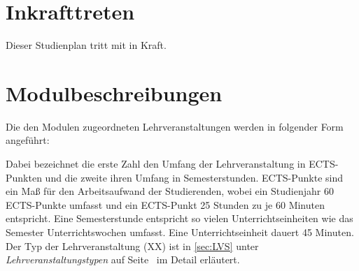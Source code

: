 %

\section{Inkrafttreten}\label{sec:IK}

Dieser Studienplan tritt mit  in Kraft.

%

\appendix
\section{Modulbeschreibungen}\label{app:AMB}

Die den Modulen zugeordneten Lehrveranstaltungen werden in folgender
Form angeführt:

\noindent
Dabei bezeichnet die erste Zahl den Umfang der Lehrveranstaltung in
ECTS-Punkten und die zweite ihren Umfang in
Semesterstunden. ECTS-Punkte sind ein Maß für den Arbeitsaufwand der
Studierenden, wobei ein Studienjahr 60 ECTS-Punkte umfasst und ein
ECTS-Punkt 25 Stunden zu je 60 Minuten entspricht. Eine Semesterstunde
entspricht so vielen Unterrichtseinheiten wie das Semester
Unterrichtswochen umfasst. Eine Unterrichtseinheit dauert 45 Minuten.
Der Typ der Lehrveranstaltung (XX) ist in \ref{sec:LVS}
unter \emph{Lehrveranstaltungstypen} auf Seite~\pageref{sec:LVA-Typ}
im Detail erläutert.

%

